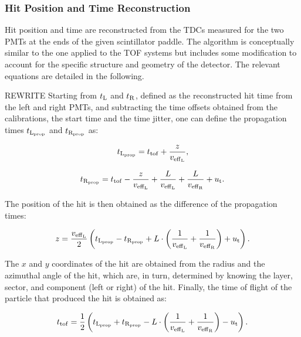 %
%

\subsubsection{Hit Position and Time Reconstruction}

Hit position and time are reconstructed from the TDCs measured for the two PMTs at the ends of the given
scintillator paddle. The algorithm is conceptually similar to the one applied to the TOF systems but includes
some modification to account for the specific structure and geometry of the detector. The relevant equations
are detailed in the following.

{\color{red} REWRITE Starting from $t_{\rm{L}}$ and $t_{\rm{R}}$, defined as the reconstructed hit time from
  the left and right PMTs, and subtracting the time offsets obtained from the calibrations, the start time and the
  time jitter, one can define the propagation times $t_{\rm{L}_{\rm{prop}}}$ and $t_{\rm{R}_{\rm{prop}}}$ as:

\begin{equation}
t_{\rm{L}_{\rm{prop}}}=t_{\rm{tof}}+\frac{z}{v_{\rm{eff}_{\rm{L}}}},
\end{equation}

\begin{equation}
t_{\rm{R}_{\rm{prop}}}=t_{\rm{tof}}-\frac{z}{v_{\rm{eff}_{\rm{L}}}}+\frac{L}{v_{\rm{eff}_{\rm{L}}}}
+\frac{L}{v_{\rm{eff}_{\rm{R}}}}+u_{\rm{t}}.
\end{equation}

The position of the hit is then obtained as the difference of the propagation times:

\begin{equation}
z=\frac{v_{\rm{eff}_{\rm{L}}}}{2} \left(t_{\rm{L}_{\rm{prop}}}-t_{\rm{R}_{\rm{prop}}}
+ L \cdot \left(\frac{1}{v_{\rm{eff}_{\rm{L}}}}+\frac{1}{v_{\rm{eff}_{\rm{R}}}}\right)  +u_{\rm{t}}\right).
\end{equation}

The $x$ and $y$ coordinates of the hit are obtained from the radius and the azimuthal angle of the hit, which
are, in turn, determined by knowing the layer, sector, and component (left or right) of the hit.  Finally, the time
of flight of the particle that produced the hit is obtained as:

\begin{equation}
t_{\rm{tof}}= \frac{1}{2}\left(t_{\rm{L}_{\rm{prop}}}+t_{\rm{R}_{\rm{prop}}}- L \cdot \left(\frac{1}{v_{\rm{eff}_{\rm{L}}}}
+\frac{1}{v_{\rm{eff}_{\rm{R}}}}\right)  -u_{\rm{t}}\right).
\end{equation}}

